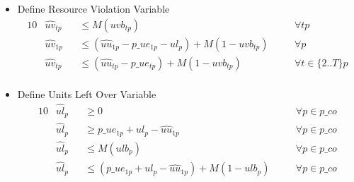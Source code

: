 \begin{itemize}
	
	\item Define Resource Violation Variable
	\begin{alignat}{10}
		& \hat{uv}_{tp} 
		&& \le  M(uvb_{tp}) \quad
		&& \forall tp \\
		& \hat{uv}_{1p} 
		&& \le  (\hat{uu}_{1p} - p\_ue_{1p} - ul_{p}) + M(1-uvb_{tp}) \quad
		&& \forall p \\
		& \hat{uv}_{tp} 
		&& \le  (\hat{uu}_{tp} - p\_ue_{tp}) + M(1-uvb_{tp}) \quad
		&& \forall t \in \{ 2..T \} p \\
	\end{alignat}
	
	\item Define Units Left Over Variable
	\begin{alignat}{10}
		& \hat{ul}_{p} 
		&& \ge 0 \quad 
		&& \forall p  \in p\_co \\
		& \hat{ul}_{p} 
		&& \ge p\_ue_{1p} + ul_{p} - \hat{uu}_{1p} \quad 
		&& \forall p  \in p\_co\\
		& \hat{ul}_{p} 
		&& \le M (ulb_{p}) \quad 
		&& \forall p  \in p\_co\\
		& \hat{ul}_{p} 
		&& \le (p\_ue_{1p} + ul_{p} - \hat{uu}_{1p}) + M(1-ulb_{p}) \quad 
		&& \forall p  \in p\_co
	\end{alignat}
\end{itemize}

